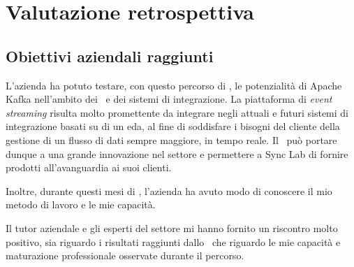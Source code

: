 \chapter{Valutazione retrospettiva}

%
%
%
%
%
%
\section{Obiettivi aziendali raggiunti}

L'azienda ha potuto testare, con questo percorso di \stage, le potenzialità di Apache Kafka nell'ambito dei \middleware\ e dei sistemi di integrazione.
La piattaforma di \textit{event streaming} risulta molto promettente da integrare negli attuali e futuri sistemi di integrazione basati su di un \acrlong{eda}, al fine di soddisfare i bisogni del cliente della gestione di un flusso di dati sempre maggiore, in tempo reale.
Il \software\ può portare dunque a una grande innovazione nel settore  e permettere a Sync Lab di fornire prodotti all'avanguardia ai suoi clienti.

Inoltre, durante questi mesi di \stage, l'azienda ha avuto modo di conoscere il mio metodo di lavoro e le mie capacità.

Il tutor aziendale e gli esperti del settore mi hanno fornito un riscontro molto positivo, sia riguardo i risultati raggiunti dallo \stage\ che riguardo le mie capacità e maturazione professionale osservate durante il percorso.

